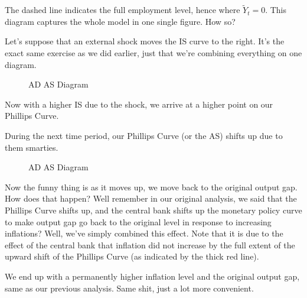\documentclass[11pt]{scrartcl}
\newcommand{\og}{\ensuremath{\tilde{Y}}}
\begin{document}
The dashed line indicates the full employment level, hence where $\og_t = 0$. This diagram captures the whole model in one single figure. How so?

Let's suppose that an external shock moves the IS curve to the right. It's the exact same exercise as we did earlier, just that we're combining everything on one diagram.

\begin{figure}[H]
\centering
{}
\caption{\color{blue}AD \color{black} AS Diagram}
\end{figure}

Now with a higher IS due to the shock, we arrive at a higher point on our Phillips Curve.

During the next time period, our Phillips Curve (or the AS) shifts up due to them smarties.

\begin{figure}[H]
\centering
{}
\caption{\color{blue}AD \color{black} AS Diagram}
\end{figure}

Now the funny thing is as it moves up, we move back to the original output gap. How does that happen? Well remember in our original analysis, we said that the Phillips Curve shifts up, and the central bank shifts up the monetary policy curve to make output gap go back to the original level in response to increasing inflations? Well, we've simply combined this effect. Note that it is due to the effect of the central bank that inflation did not increase by the full extent of the upward shift of the Phillips Curve (as indicated by the thick red line).  

We end up with a permanently higher inflation level and the original output gap, same as our previous analysis. Same shit, just a lot more convenient.
\end{document}
